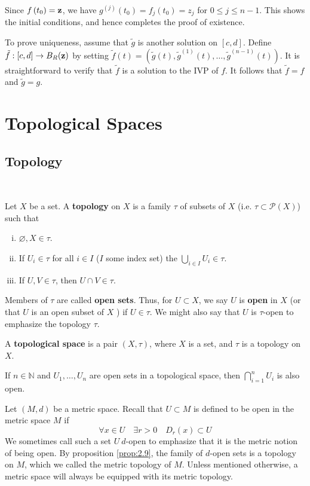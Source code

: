 \documentclass[a4paper,11pt]{article}
\begin{document}
Since $f\left(t_0\right)={\bf z}$, we have $g^{(j)}\left(t_0\right)=f_j\left(t_0\right)=z_j$ for $0 \leqslant j \leqslant n-1$. This shows the initial conditions, and hence completes the proof of existence.

To prove uniqueness, assume that $\tilde{g}$ is another solution on $[c, d]$. Define $\tilde{f}:[c, d] \rightarrow B_R({\bf z})$ by setting $\tilde{f}(t)=\left(\tilde{g}(t), \tilde{g}^{(1)}(t), \ldots, \tilde{g}^{(n-1)}(t)\right)$. It is straightforward to verify that $\tilde{f}$ is a solution to the IVP of $f$. It follows that $\tilde{f}=f$ and $\tilde{g}=g$.

\section{Topological Spaces}
\subsection{Topology}\ \vspace{-1.5em}
\begin{definition}
    Let $X$ be a set. A \textbf{topology} on $X$ is a family $\tau$ of subsets of $X$ (i.e. $ \tau\subset \mathcal{P}(X) $) such that 
    \begin{enumerate}[(i)]
        \item $ \varnothing, X\in \tau $.
        \item If $U_i\in \tau$ for all $i\in I$ ($I$ some index set) the $ \bigcup_{i\in I} U_i\in \tau $. 
        \item If $ U,V\in \tau $, then $ U\cap V\in \tau $. 
    \end{enumerate}
    Members of $\tau$ are called \textbf{open sets}. Thus, for $U \subset X$, we say $U$ is \textbf{open} in $X$ (or that $U$ is an open subset of $X$ ) if $U \in \tau$. We might also say that $U$ is $\tau$-open to emphasize the topology $\tau$.

    A \textbf{topological space} is a pair $(X, \tau)$, where $X$ is a set, and $\tau$ is a topology on $X$.
\end{definition}

\begin{note}
    If $n \in \mathbb{N}$ and $U_1, \ldots, U_n$ are open sets in a topological space, then $\bigcap_{i=1}^n U_i$ is also open.
\end{note}

\begin{example}
    Let $(M, d)$ be a metric space. Recall that $U \subset M$ is defined to be open in the metric space $M$ if
    \[
    \forall x \in U \quad \exists r>0 \quad D_r(x) \subset U
    \]
    We sometimes call such a set $U\ d$-open to emphasize that it is the metric notion of being open. By proposition \ref{prop:2.9}, the family of $d$-open sets is a topology on $M$, which we called the metric topology of $M$.
    Unless mentioned otherwise, a metric space will always be equipped with its metric topology.
    
\end{example}
\end{document}
